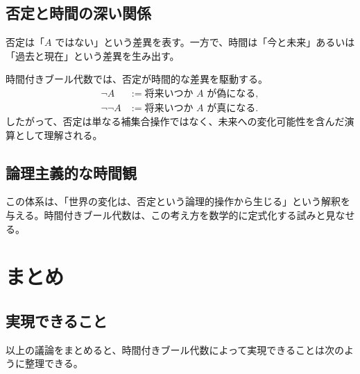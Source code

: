 \documentclass[10pt]{ltjsarticle}
\begin{document}
\subsection{否定と時間の深い関係}

否定は「$A$ ではない」という差異を表す。一方で、時間は「今と未来」あるいは「過去と現在」という差異を生み出す。

時間付きブール代数では、否定が時間的な差異を駆動する。
\begin{align*}
  \neg A &:= \text{将来いつか $A$ が偽になる}, \\
  \neg\neg A &:= \text{将来いつか $A$ が真になる}.
\end{align*}
したがって、否定は単なる補集合操作ではなく、未来への変化可能性を含んだ演算として理解される。

\subsection{論理主義的な時間観}

この体系は、「世界の変化は、否定という論理的操作から生じる」という解釈を与える。時間付きブール代数は、この考え方を数学的に定式化する試みと見なせる。

\section{まとめ}


\subsection{実現できること}

以上の議論をまとめると、時間付きブール代数によって実現できることは次のように整理できる。
\end{document}
